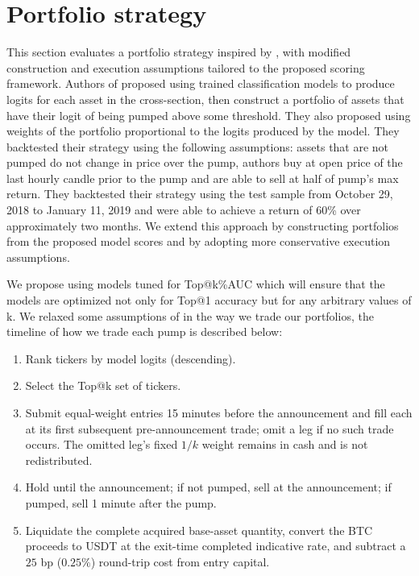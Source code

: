 \documentclass{ieeeaccess}
\begin{document}
\section{Portfolio strategy}
\label{sec:portfolio}

This section evaluates a portfolio strategy inspired by \cite{pd_anatomy}, with modified construction and execution assumptions tailored to the proposed scoring framework. Authors of \cite{pd_anatomy} proposed using trained classification models to produce logits for each asset in the cross-section, then construct a portfolio of assets that have their logit of being pumped above some threshold. They also proposed using weights of the portfolio proportional to the logits produced by the model. They backtested their strategy using the following assumptions: assets that are not pumped do not change in price over the pump, authors buy at open price of the last hourly candle prior to the pump and are able to sell at half of pump's max return. They backtested their strategy using the test sample from October 29, 2018 to January 11, 2019 and were able to achieve a return of 60\% over approximately two months. We extend this approach by constructing portfolios from the proposed model scores and by adopting more conservative execution assumptions. 

We propose using models tuned for Top@k\%AUC which will ensure that the models are optimized not only for Top@1 accuracy but for any arbitrary values of k. We relaxed some assumptions of \cite{pd_anatomy} in the way we trade our portfolios, the timeline of how we trade each pump is described below:

\begin{enumerate}
  \item Rank tickers by model logits (descending).
  \item Select the Top@k set of tickers.
  \item Submit equal-weight entries 15 minutes before the announcement and fill each at its first subsequent pre-announcement trade; omit a leg if no such trade occurs. The omitted leg's fixed $1/k$ weight remains in cash and is not redistributed.
  \item Hold until the announcement; if not pumped, sell at the announcement; if pumped, sell 1 minute after the pump.
  \item Liquidate the complete acquired base-asset quantity, convert the BTC proceeds to USDT at the exit-time completed indicative rate, and subtract a $25$ bp ($0.25\%$) round-trip cost from entry capital.
\end{enumerate}
\end{document}
